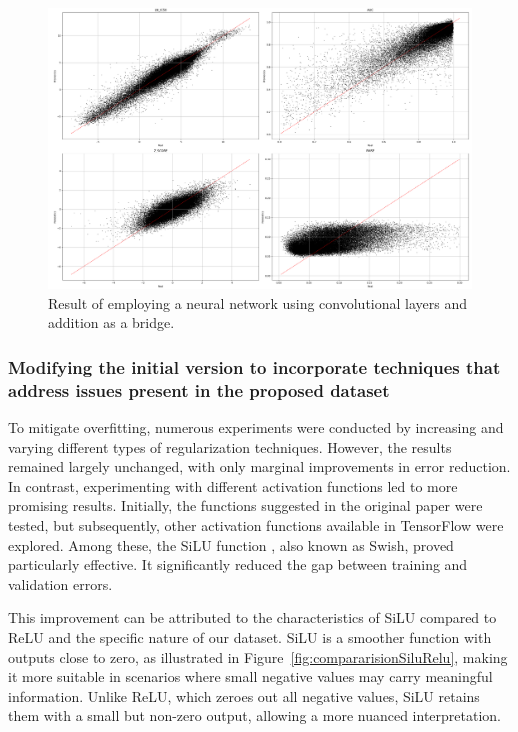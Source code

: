 \begin{figure}[H]
    \centering
    \includegraphics[width=1\textwidth]{figures/neural_net_regression_addition/output_neural_net_addition_desbalanced.png}
    \caption{Result of employing a neural network using convolutional layers and addition as a bridge.}
    \label{fig:result_addtion_reg}
\end{figure}

\subsubsection{Modifying the initial version to incorporate techniques that address issues present in the proposed dataset}

To mitigate overfitting, numerous experiments were conducted by increasing and varying different types of regularization techniques. However, the results remained largely unchanged, with only marginal improvements in error reduction. In contrast, experimenting with different activation functions led to more promising results. Initially, the functions suggested in the original paper were tested, but subsequently, other activation functions available in TensorFlow were explored. Among these, the SiLU function \cite{silu}, also known as Swish, proved particularly effective. It significantly reduced the gap between training and validation errors.

This improvement can be attributed to the characteristics of SiLU compared to ReLU and the specific nature of our dataset. SiLU is a smoother function with outputs close to zero, as illustrated in Figure~\ref{fig:compararisionSiluRelu}, making it more suitable in scenarios where small negative values may carry meaningful information. Unlike ReLU, which zeroes out all negative values, SiLU retains them with a small but non-zero output, allowing a more nuanced interpretation.

